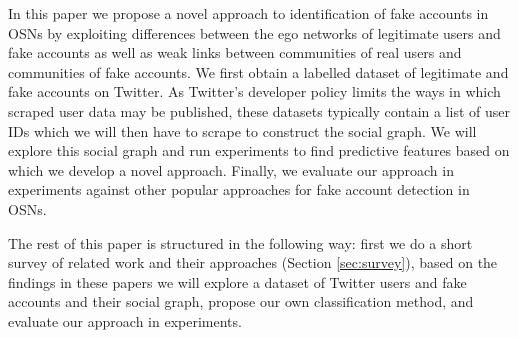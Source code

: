 

In this paper we propose a novel approach to identification of fake accounts in OSNs by exploiting differences between the ego networks of legitimate users and fake accounts as well as weak links between communities of real users and communities of fake accounts. We first obtain a labelled dataset of legitimate and fake accounts on Twitter. As Twitter's developer policy limits the ways in which scraped user data may be published, these datasets typically contain a list of user IDs which we will then have to scrape to construct the social graph. We will explore this social graph and run experiments to find predictive features based on which we develop a novel approach. Finally, we evaluate our approach in experiments against other popular approaches for fake account detection in OSNs.

The rest of this paper is structured in the following way: first we do a short survey of related work and their approaches (Section \ref{sec:survey}), based on the findings in these papers we will explore a dataset of Twitter users and fake accounts and their social graph, propose our own classification method, and evaluate our approach in experiments.